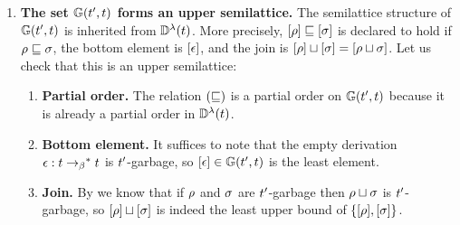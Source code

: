 \begin{enumerate}
\item
  {\bf The set $\mathbb{G}(t', t)$ forms an upper semilattice.}
  The semilattice structure of $\mathbb{G}(t', t)$ is inherited from $\mathbb{D}^{\lambda}(t)$.
  More precisely, ${[\rho]} \sqsubseteq {[\sigma]}$ is declared to hold if $\rho \sqsubseteq \sigma$,
  the bottom element is ${[\epsilon]}$, and the join is
  ${[\rho]} \sqcup {[\sigma]} = {[\rho \sqcup \sigma]}$.
  Let us check that this is an upper semilattice:
  \begin{enumerate}
  \item {\bf Partial order.}
    The relation $(\sqsubseteq)$ is a partial order on $\mathbb{G}(t', t)$ because it is already a partial order in $\mathbb{D}^{\lambda}(t)$.
  \item {\bf Bottom element.}
    It suffices to note that the empty derivation $\epsilon : t \mathrel{\to_\beta}^* t$
    is $t'$-garbage, so ${[\epsilon]} \in \mathbb{G}(t', t)$
    is the least element.
  \item {\bf Join.}
    By  we know that if $\rho$ and $\sigma$
    are $t'$-garbage then $\rho \sqcup \sigma$ is $t'$-garbage,
    so ${[\rho]} \sqcup {[\sigma]}$ is indeed the least upper bound
    of $\{{[\rho]}, {[\sigma]}\}$.
  \end{enumerate}
\end{enumerate}

